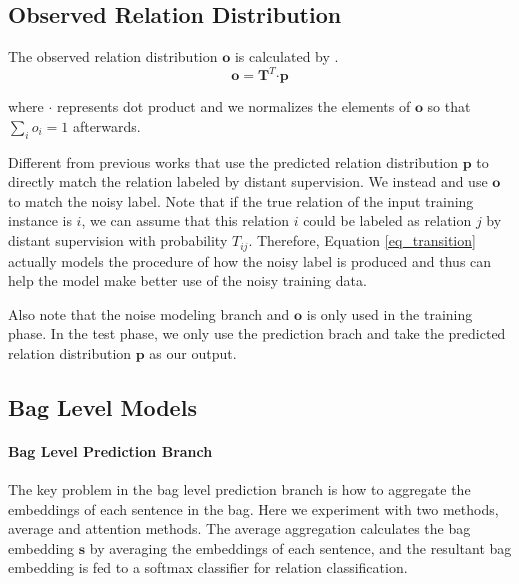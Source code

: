 \subsection{Observed Relation Distribution}
The observed relation distribution $\mathbf{o}$ is calculated by . %
 \begin{equation}
\mathbf{o} = \mathbf{T}^T \bm\cdot \mathbf{p}
\label{eq_transition}
 \end{equation}

 where $\bm\cdot$ represents dot product and we normalizes the elements of $\mathbf{o}$ so that $\sum_i{o_i}=1$ afterwards.
 
Different from previous works that use the predicted relation distribution $\mathbf{p}$ to directly match the relation labeled by distant supervision. We instead  and use $\mathbf{o}$ to match the noisy label. Note that if the true relation of the input training instance is $i$, we can assume that this relation $i$ could be labeled as relation $j$ by distant supervision with probability $T_{ij}$. Therefore, Equation \ref{eq_transition} actually models the procedure of how the noisy label is produced and thus can help the model make better use of the noisy training data. 

Also note that the noise modeling branch and $\mathbf{o}$ is only used in the training phase. In the test phase, we only use the prediction brach and take the predicted relation distribution $\mathbf{p}$ as our output. 

\subsection{Bag Level Models}
\paragraph{Bag Level Prediction Branch}
The key problem in the bag level prediction branch is how to aggregate the embeddings of each sentence in the bag. Here we experiment with two methods, average and attention methods. The average aggregation calculates the bag embedding $\mathbf{s}$ by averaging the embeddings of each sentence, and the resultant bag embedding is fed to a softmax classifier for relation classification. 

